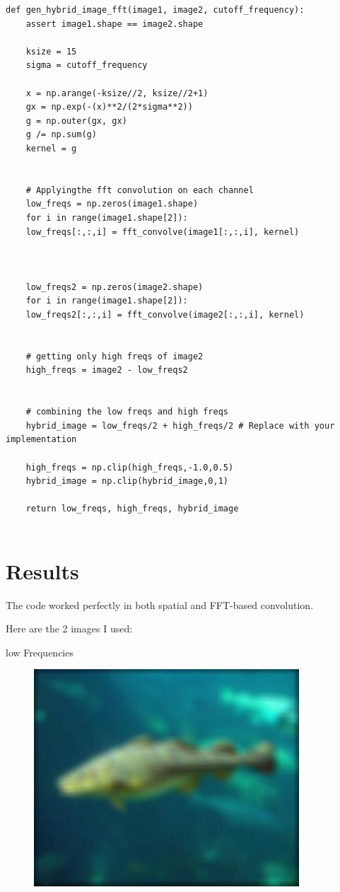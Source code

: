 \newpage
	
\begin{lstlisting}
def gen_hybrid_image_fft(image1, image2, cutoff_frequency):
	assert image1.shape == image2.shape
	
	ksize = 15
	sigma = cutoff_frequency
	
	x = np.arange(-ksize//2, ksize//2+1)
	gx = np.exp(-(x)**2/(2*sigma**2))
	g = np.outer(gx, gx)
	g /= np.sum(g)
	kernel = g
	
	
	# Applyingthe fft convolution on each channel
	low_freqs = np.zeros(image1.shape)
	for i in range(image1.shape[2]):
	low_freqs[:,:,i] = fft_convolve(image1[:,:,i], kernel)
	
	
	
	low_freqs2 = np.zeros(image2.shape)
	for i in range(image1.shape[2]):
	low_freqs2[:,:,i] = fft_convolve(image2[:,:,i], kernel)
	
	
	# getting only high freqs of image2
	high_freqs = image2 - low_freqs2
	
	
	# combining the low freqs and high freqs
	hybrid_image = low_freqs/2 + high_freqs/2 # Replace with your implementation
	
	high_freqs = np.clip(high_freqs,-1.0,0.5)
	hybrid_image = np.clip(hybrid_image,0,1)
	
	return low_freqs, high_freqs, hybrid_image


\end{lstlisting}
\newpage

\section{Results}
The code worked perfectly in both spatial and FFT-based convolution.


Here are the 2 images I used:

low Frequencies
\begin{figure}[h]
\includegraphics{../results/low_frequencies}
\label{fig:low frequencies}
\end{figure}

